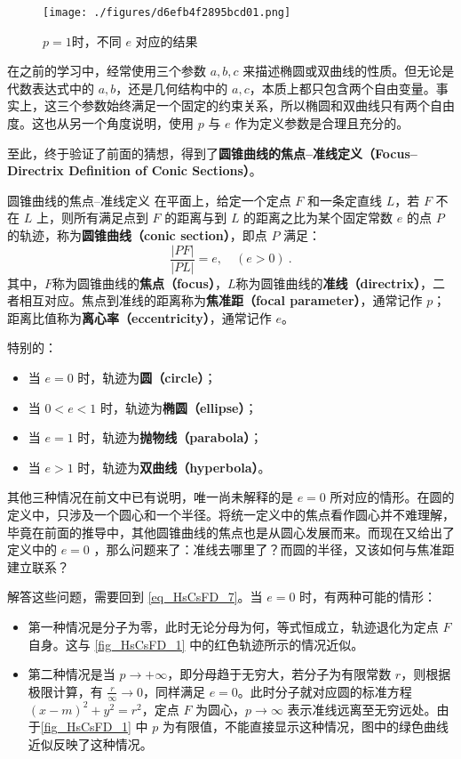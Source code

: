 \begin{figure}[ht]
\centering
\texttt{[image: ./figures/d6efb4f2895bcd01.png]}
\caption{$p = 1$时，不同 $e$ 对应的结果} \label{fig_HsCsFD_1}
\end{figure}


在之前的学习中，经常使用三个参数 $a, b, c$ 来描述椭圆或双曲线的性质。但无论是代数表达式中的 $a, b$，还是几何结构中的 $a, c$，本质上都只包含两个自由变量。事实上，这三个参数始终满足一个固定的约束关系，所以椭圆和双曲线只有两个自由度。这也从另一个角度说明，使用 $p$ 与 $e$ 作为定义参数是合理且充分的。

至此，终于验证了前面的猜想，得到了\textbf{圆锥曲线的焦点–准线定义（Focus–Directrix Definition of Conic Sections）}。

\begin{definition}{圆锥曲线的焦点–准线定义}\label{def_HsCsFD_1}
在平面上，给定一个定点 $F$ 和一条定直线 $L$，若 $F$ 不在 $L$ 上，则所有满足点到 $F$ 的距离与到 $L$ 的距离之比为某个固定常数 $e$ 的点 $P$ 的轨迹，称为\textbf{圆锥曲线（conic section）}，即点 $P$ 满足：
\begin{equation}
\frac{|PF|}{|PL|} = e,\quad(e>0)~.
\end{equation}
其中，$F$称为圆锥曲线的\textbf{焦点（focus）}，$L$称为圆锥曲线的\textbf{准线（directrix）}，二者相互对应。焦点到准线的距离称为\textbf{焦准距（focal parameter）}，通常记作 $p$；距离比值称为\textbf{离心率（eccentricity）}，通常记作 $e$。

特别的：
\begin{itemize}
\item 当 $e = 0$ 时，轨迹为\textbf{圆（circle）}；
\item 当 $0 < e < 1$ 时，轨迹为\textbf{椭圆（ellipse）}；
\item 当 $e = 1$ 时，轨迹为\textbf{抛物线（parabola）}；
\item 当 $e > 1$ 时，轨迹为\textbf{双曲线（hyperbola）}。
\end{itemize}
\end{definition}

其他三种情况在前文中已有说明，唯一尚未解释的是 $e = 0$ 所对应的情形。在圆的定义中，只涉及一个圆心和一个半径。将统一定义中的焦点看作圆心并不难理解，毕竟在前面的推导中，其他圆锥曲线的焦点也是从圆心发展而来。而现在又给出了定义中的 $e = 0$ ，那么问题来了：准线去哪里了？而圆的半径，又该如何与焦准距建立联系？

解答这些问题，需要回到 \autoref{eq_HsCsFD_7}。当 $e = 0$ 时，有两种可能的情形：
\begin{itemize}
\item 第一种情况是分子为零，此时无论分母为何，等式恒成立，轨迹退化为定点 $F$ 自身。这与 \autoref{fig_HsCsFD_1} 中的红色轨迹所示的情况近似。
\item 第二种情况是当 $p \to +\infty$，即分母趋于无穷大，若分子为有限常数 $r$，则根据极限计算，有 $\displaystyle\frac{r}{\infty} \to 0$，同样满足 $e = 0$。此时分子就对应圆的标准方程 $(x - m)^2 + y^2 = r^2$，定点 $F$ 为圆心，$p \to \infty$ 表示准线远离至无穷远处。由于\autoref{fig_HsCsFD_1} 中 $p$ 为有限值，不能直接显示这种情况，图中的绿色曲线近似反映了这种情况。
\end{itemize}

